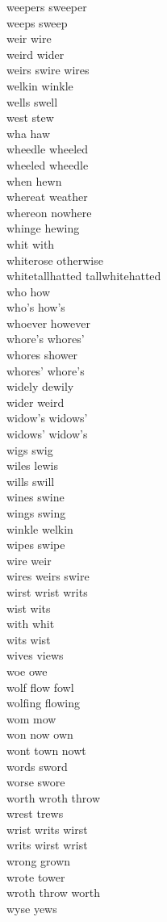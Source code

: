 weepers sweeper\\
weeps sweep\\
weir wire\\
weird wider\\
weirs swire wires\\
welkin winkle\\
wells swell\\
west stew\\
wha haw\\
wheedle wheeled\\
wheeled wheedle\\
when hewn\\
whereat weather\\
whereon nowhere\\
whinge hewing\\
whit with\\
whiterose otherwise\\
whitetallhatted tallwhitehatted\\
who how\\
who's how's\\
whoever however\\
whore's whores'\\
whores shower\\
whores' whore's\\
widely dewily\\
wider weird\\
widow's widows'\\
widows' widow's\\
wigs swig\\
wiles lewis\\
wills swill\\
wines swine\\
wings swing\\
winkle welkin\\
wipes swipe\\
wire weir\\
wires weirs swire\\
wirst wrist writs\\
wist wits\\
with whit\\
wits wist\\
wives views\\
woe owe\\
wolf flow fowl\\
wolfing flowing\\
wom mow\\
won now own\\
wont town nowt\\
words sword\\
worse swore\\
worth wroth throw\\
wrest trews\\
wrist writs wirst\\
writs wirst wrist\\
wrong grown\\
wrote tower\\
wroth throw worth\\
wyse yews\\

